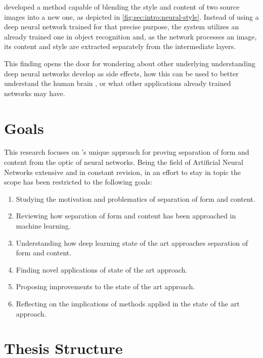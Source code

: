 \citeauthor{Gatys2015B} developed a method capable of blending the style and content of two source images into a new one, as depicted in \autoref{fig:sec:intro:neural-style}.
Instead of using a deep neural network trained for that precise purpose, the system utilizes an already trained one in object recognition and, as the network processes an image, its content and style are extracted separately from the intermediate layers.

This finding opens the door for wondering about other underlying understanding deep neural networks develop as side effects, how this can be used to better understand the human brain \cite{Yamins2016}, or what other applications already trained networks may have.



\section{Goals}
\label{sec:intro:goals}

This research focuses on \citeauthor{Gatys2015B}'s unique approach for proving separation of form and content from the optic of neural networks.
Being the field of Artificial Neural Networks extensive and in constant revision, in an effort to stay in topic the scope has been restricted to the following goals:

\begin{enumerate}
  \item Studying the motivation and problematics of separation of form and content.
  \item Reviewing how separation of form and content has been approached in machine learning.
  \item Understanding how deep learning state of the art approaches separation of form and content.
  \item Finding novel applications of state of the art approach.
  \item Proposing improvements to the state of the art approach.
  \item Reflecting on the implications of methods applied in the state of the art approach.
\end{enumerate}



\section{Thesis Structure}
\label{sec:intro:structure}

